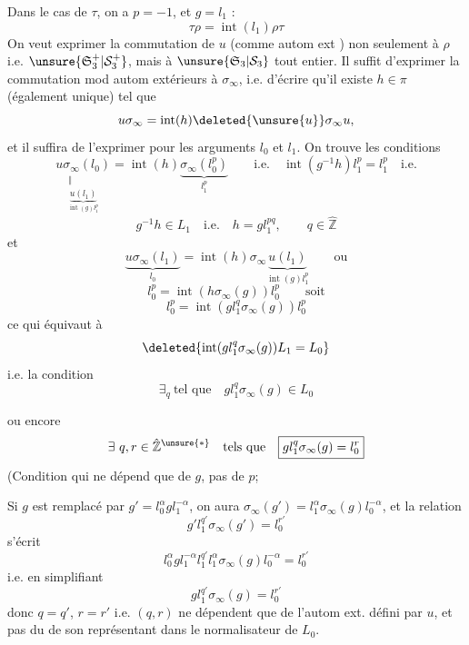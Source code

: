 Dans le cas de $\tau$, on a $p=-1$, et $g=l_1$ :
\[
\tau\rho=\operatorname{int}(l_1)\rho\tau
\]
On veut exprimer la commutation de $u$ (comme autom ext ) non seulement à $\rho$ i.e. $\unsure{\mathfrak S_3^+|\mathcal S_3^+}$, mais à $\unsure{\mathfrak S_3|\mathcal S_3}$ tout entier. Il suffit d'exprimer la commutation mod autom extérieurs à $\sigma_\infty$, i.e. d'écrire qu'il existe $h\in\pi$ (également unique) tel que
\[
u\sigma_\infty=\operatorname{int}(h)\deleted{\unsure{u}}\sigma_\infty u,
\]
et il suffira de l'exprimer pour les arguments $l_0$ et $l_1$. On trouve les conditions
\[
\underset{\substack{\Vert\\\underbrace{u(l_1)}_{\operatorname{int}(g)l_1^p}}}{u\sigma_\infty(l_0)}=\operatorname{int}(h)\underbrace{\sigma_\infty(l_0^p)}_{l_1^p}
\qquad\text{i.e.}\quad\operatorname{int}(g^{-1}h)l_1^p=l_1^p\quad\text{i.e.}
\]
\[
g^{-1}h\in L_1\quad\text{i.e.}\quad h=gl_1^{pq},\qquad q\in\hat{\mathbb Z}
\]
et
\[
\underbrace{u\sigma_\infty(l_1)}_{l_0}=\operatorname{int}(h)\sigma_\infty\underbrace{u(l_1)}_{\operatorname{int}(g)l_1^p}\qquad\text{ou}
\]
\[
l_0^p=\operatorname{int}(h\sigma_\infty(g))l_0^p\qquad\text{soit}
\]
\[
l_0^p=\operatorname{int}(gl_1^q\sigma_\infty(g))l_0^p
\]
ce qui équivaut à
\[
\deleted{\operatorname{int}(gl_1^q\sigma_\infty(g))L_1=L_0}
\]
i.e. la condition
\[
\exists_q\ \text{tel que}\quad gl_1^q\sigma_\infty(g)\in L_0
\]

ou encore
\[
\exists\ q,r\in\hat{\mathbb Z}^{\unsure{*}}\quad\text{tels que}\quad\boxed{gl_1^q\sigma_\infty(g)=l_0^r}
\]
(Condition qui ne dépend que de $g$, pas de $p$;

Si $g$ est remplacé par $g'=l_0^\alpha gl_1^{-\alpha}$, on aura $\sigma_\infty(g')=l_1^\alpha\sigma_\infty(g)l_0^{-\alpha}$, et la relation
\[
g'l_1^{q'}\sigma_\infty(g')=l_0^{r'}
\]
s'écrit
\[
l_0^\alpha gl_1^{-\alpha}l_1^{q'}l_1^\alpha\sigma_\infty(g)l_0^{-\alpha}=l_0^{r'}
\]
i.e. en simplifiant
\[
gl_1^{q'}\sigma_\infty(g)=l_0^{r'}
\]
donc $q=q'$, $r=r'$ i.e. $(q,r)$ ne dépendent que de l'autom ext. défini par $u$, et pas du  de son représentant dans le normalisateur de $L_0$.

